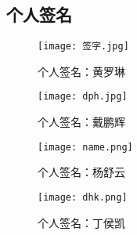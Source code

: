 \subsection{个人签名}



\begin{figure}[H]
    \centering
    \begin{minipage}{0.45\textwidth} %
        \centering
        \texttt{[image: 签字.jpg]}
        \caption{个人签名：黄罗琳}
        \label{}
    \end{minipage}%
    \hfill
    \begin{minipage}{0.45\textwidth} %
        \centering
        \texttt{[image: dph.jpg]}
        \caption{个人签名：戴鹏辉}
        \label{}
    \end{minipage}
\end{figure}

\begin{figure}[H]
    \centering
    \begin{minipage}{0.45\textwidth} %
        \centering
        \texttt{[image: name.png]}
        \caption{个人签名：杨舒云}
        \label{fig:name}
    \end{minipage}
    \hfill %
    \begin{minipage}{0.45\textwidth} %
        \centering
        \texttt{[image: dhk.png]}
        \caption{个人签名：丁侯凯}
        \label{fig:dhk}
    \end{minipage}
\end{figure}